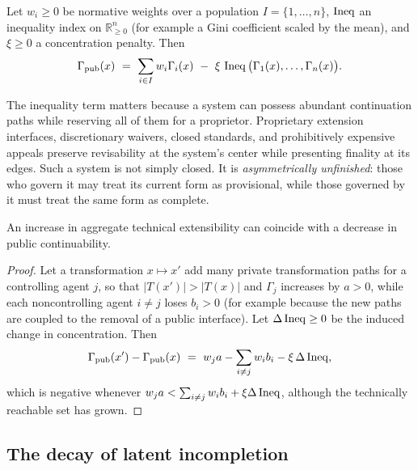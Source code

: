 \begin{definition}\label{def:public}
Let $w_i\geq 0$ be normative weights over a population $I=\{1,\dots,n\}$, $\operatorname{Ineq}$ an inequality index on $\mathbb{R}^n_{\geq 0}$ (for example a Gini coefficient scaled by the mean), and $\xi\geq 0$ a concentration penalty. Then
\begin{equation}\label{eq:Gamma-pub}
\Gamma_{\mathrm{pub}}(x)\ =\ \sum_{i\in I}w_i\Gamma_i(x)\ -\ \xi\,\Ineq\big(\Gamma_1(x),\dots,\Gamma_n(x)\big).
\end{equation}
\end{definition}

The inequality term matters because a system can possess abundant continuation paths while reserving all of them for a proprietor. Proprietary extension interfaces, discretionary waivers, closed standards, and prohibitively expensive appeals preserve revisability at the system's center while presenting finality at its edges. Such a system is not simply closed. It is \emph{asymmetrically unfinished}: those who govern it may treat its current form as provisional, while those governed by it must treat the same form as complete.

\begin{proposition}\label{prop:aggregate-public}
An increase in aggregate technical extensibility can coincide with a decrease in public continuability.
\end{proposition}

\begin{proof}
Let a transformation $x\mapsto x'$ add many private transformation paths for a controlling agent $j$, so that $|T(x')|>|T(x)|$ and $\Gamma_j$ increases by $a>0$, while each noncontrolling agent $i\neq j$ loses $b_i>0$ (for example because the new paths are coupled to the removal of a public interface). Let $\Delta\operatorname{Ineq}\geq 0$ be the induced change in concentration. Then
\[
\Gamma_{\mathrm{pub}}(x')-\Gamma_{\mathrm{pub}}(x)\ =\ w_ja-\sum_{i\neq j}w_ib_i-\xi\,\Delta\Ineq,
\]
which is negative whenever $w_ja<\sum_{i\neq j}w_ib_i+\xi\Delta\operatorname{Ineq}$, although the technically reachable set has grown.
\end{proof}

\subsection{The decay of latent incompletion}

